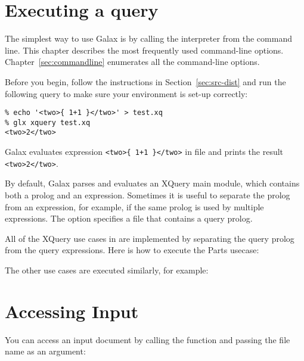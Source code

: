 \section{Executing a query}

The simplest way to use Galax is by calling the 
interpreter from the command line.  This chapter describes the most
frequently used command-line options.  Chapter~\ref{sec:commandline}
enumerates all the command-line options.

Before you begin, follow the instructions in
Section~\ref{sec:src-dist} and run the following query to make sure
your environment is set-up correctly:
\begin{verbatim}
% echo '<two>{ 1+1 }</two>' > test.xq
% glx xquery test.xq
<two>2</two>
\end{verbatim}

Galax evaluates expression \verb|<two>{ 1+1 }</two>| in file
 and prints the result \verb|<two>2</two>|.

By default, Galax parses and evaluates an XQuery main module, which
contains both a prolog and an expression.  Sometimes it is useful to
separate the prolog from an expression, for example, if the same
prolog is used by multiple expressions.   The  option
specifies a file that contains a query prolog.  

All of the XQuery use cases in  are
implemented by separating the query prolog from the query expressions.
Here is how to execute the Parts usecase:
\begin{alltt}
% cd $GALAXHOME/usecases 
% glx xquery -context parts_context.xq parts_usecase.xq
\end{alltt}

The other use cases are executed similarly, for example:
\begin{alltt}
% glx xquery -context rel_context.xq rel_usecase.xq
\end{alltt}

\section{Accessing Input}

You can access an input document by calling the
 function and passing the file name as an argument:
\begin{alltt}
% cd $GALAXHOME/usecases 
% echo 'fn:doc("docs/books.xml")' > doc.xq
% glx xquery doc.xq
\end{alltt}

